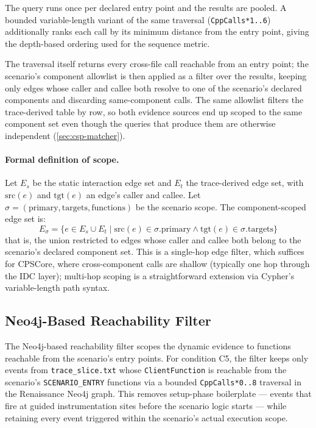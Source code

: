 The query runs once per declared entry point and the results are
pooled. A bounded variable-length variant of the same traversal
(\texttt{CppCalls*1..6}) additionally ranks each call by its minimum
distance from the entry point, giving the depth-based ordering used for
the sequence metric.

The traversal itself returns every cross-file call reachable from an
entry point; the scenario's component allowlist is then applied as a
filter over the results, keeping only edges whose caller and callee
both resolve to one of the scenario's declared components and
discarding same-component calls. The same allowlist filters the
trace-derived table by row, so both evidence sources end up scoped to
the same component set even though the queries that produce them are
otherwise independent (\cref{sec:csp-matcher}).

\paragraph{Formal definition of scope.}
Let $E_s$ be the static interaction edge set and $E_t$ the trace-derived
edge set, with $\text{src}(e)$ and $\text{tgt}(e)$ an edge's caller and
callee. Let $\sigma = (\text{primary}, \text{targets}, \text{functions})$
be the scenario scope. The component-scoped edge set is:
\[
  E_\sigma
  = \{ e \in E_s \cup E_t \mid \text{src}(e) \in \sigma.\text{primary}
       \land \text{tgt}(e) \in \sigma.\text{targets} \}
\]
that is, the union restricted to edges whose caller and callee both
belong to the scenario's declared component set. This is a single-hop
edge filter, which suffices for CPSCore, where cross-component calls are
shallow (typically one hop through the IDC layer); multi-hop scoping is
a straightforward extension via Cypher's variable-length path syntax.

\subsection{Neo4j-Based Reachability Filter}\label{sec:evidence-synthesis}

The Neo4j-based reachability filter scopes the dynamic evidence to
functions reachable from the scenario's entry points. For condition C5,
the filter keeps only events from \texttt{trace\_slice.txt} whose
\texttt{ClientFunction} is reachable from the scenario's
\texttt{SCENARIO\_ENTRY} functions via a bounded
\texttt{CppCalls*0..8} traversal in the Renaissance Neo4j graph. This
removes setup-phase boilerplate --- events that fire at guided
instrumentation sites before the scenario logic starts --- while
retaining every event triggered within the scenario's actual execution
scope.

